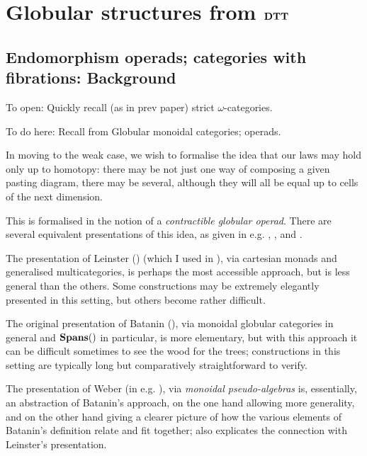 \documentclass{amsart}
\begin{document}
\section{Globular structures from $\mathbf{DTT}$}


\comment{Give: the globes, and variants of globes; the Kan constructions; fact that pasting diagrams get realised by these; resulting functors $\DTT \to \Alg{\End(\globes)}$.]}

\subsection{Endomorphism operads; categories with fibrations: Background}
\label{subsec:endo-operads}

To open: Quickly recall (as in prev paper) strict $\omega$-categories.

To do here: Recall from \cite{batanin:natural-environment} Globular monoidal categories; operads.

In moving to the weak case, we wish to formalise the idea that our laws may hold only up to homotopy: there may be not just one way of composing a given pasting diagram, there may be several, although they will all be equal up to cells of the next dimension. 

This is formalised in the notion of a \emph{contractible globular operad}.  There are several equivalent presentations of this idea, as given in e.g. \cite{batanin:natural-environment}, \cite{leinster:book}, and \cite{weber:operads-within}.

The presentation of Leinster (\cite{leinster:book}) (which I used in \cite{lumsdaine:tlca}), via cartesian monads and generalised multicategories, is perhaps the most accessible approach, but is less general than the others.  Some constructions may be extremely elegantly presented in this setting, but others become rather difficult.

The original presentation of Batanin (\cite{batanin:natural-environment}), via monoidal globular categories in general and $\mathbf{Spans}()$ in particular, is more elementary, but with this approach it can be difficult sometimes to see the wood for the trees; constructions in this setting are typically long but comparatively straightforward to verify.  

The presentation of Weber (in e.g. \cite{weber:operads-within}), via \emph{monoidal pseudo-algebras} is, essentially, an abstraction of Batanin's approach, on the one hand allowing more generality, and on the other hand giving a clearer picture of how the various elements of Batanin's definition relate and fit together; \cite{weber:operads-within} also explicates the connection with Leinster's presentation.
\end{document}
